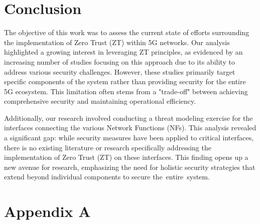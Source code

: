 \documentclass{report}
\begin{document}
\section{Conclusion}
    The objective of this work was to assess the current state of efforts surrounding the implementation of Zero Trust (ZT) within 5G networks. Our analysis highlighted a growing interest in leveraging ZT principles, as evidenced by an increasing number of studies focusing on this approach due to its ability to address various security challenges. However, these studies primarily target specific components of the system rather than providing security for the entire 5G ecosystem. This limitation often stems from a "trade-off" between achieving comprehensive security and maintaining operational efficiency.  

    Additionally, our research involved conducting a threat modeling exercise for the interfaces connecting the various Network Functions (NFs). This analysis revealed a significant gap: while security measures have been applied to critical interfaces, there is no existing literature or research specifically addressing the implementation of Zero Trust (ZT) on these interfaces. This finding opens up a new avenue for research, emphasizing the need for holistic security strategies that extend beyond individual components to secure the entire system.



\appendix
\section{Appendix A}
\end{document}
